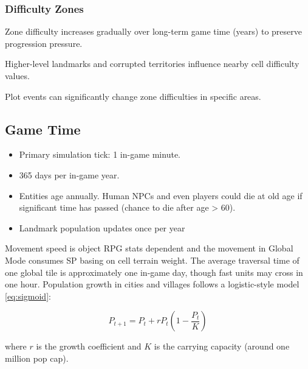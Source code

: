\subsubsection{Difficulty Zones}

Zone difficulty increases gradually over long-term game time (years) to preserve progression pressure.

Higher-level landmarks and corrupted territories influence nearby cell difficulty values.

Plot events can significantly change zone difficulties in specific areas.

\subsection{Game Time}

\begin{itemize}
\item Primary simulation tick: 1 in-game minute.
\item 365 days per in-game year.
\item Entities age annually. Human NPCs and even players could die at old age if significant time has passed (chance to die after age > 60).
\item Landmark population updates once per year
\end{itemize}

Movement speed is object RPG stats dependent and the movement in Global Mode consumes SP basing on cell terrain weight.
The average traversal time of one global tile is approximately one in-game day, though fast units may cross in one hour.
Population growth in cities and villages follows a logistic-style model \autoref{eq:sigmoid}:

\begin{equation}
P_{t+1} = P_t + rP_t \left(1 - \frac{P_t}{K} \right)
 \label{eq:sigmoid}
\end{equation}

where $r$ is the growth coefficient and $K$ is the carrying capacity (around one million pop cap).







